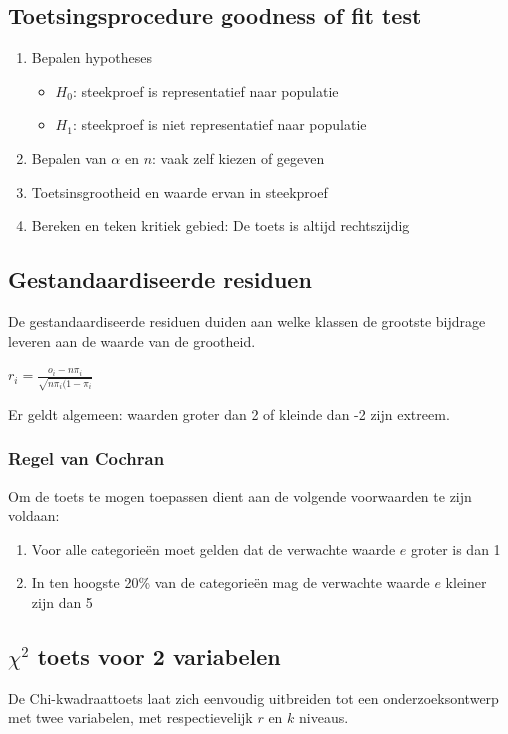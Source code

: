 \documentclass[a4paper,12pt]{article}
\begin{document}
\subsection{Toetsingsprocedure goodness of fit test}
\begin{enumerate}
\item Bepalen hypotheses
	\begin{itemize}
	\item $H_0$: steekproef is representatief naar populatie
	\item $H_1$: steekproef is niet representatief naar populatie
	\end{itemize}
\item Bepalen van $\alpha$ en $n$: vaak zelf kiezen of gegeven
\item Toetsinsgrootheid en waarde ervan in steekproef
\item Bereken en teken kritiek gebied: De toets is altijd rechtszijdig
\end{enumerate}

\subsection{Gestandaardiseerde residuen}
De gestandaardiseerde residuen duiden aan welke klassen de grootste bijdrage leveren aan de waarde van de grootheid.

$r_i = \frac{o_i-n\pi_i}{\sqrt{n\pi_i(1-\pi_i}}$

Er geldt algemeen: waarden groter dan 2 of kleinde dan -2 zijn extreem.

\subsubsection{Regel van Cochran}

Om de toets te mogen toepassen dient aan de volgende voorwaarden te zijn voldaan:
\begin{enumerate}
\item Voor alle categorieën moet gelden dat de verwachte waarde $e$ groter is dan 1
\item In ten hoogste 20\% van de categorieën mag de verwachte waarde $e$ kleiner zijn dan 5
\end{enumerate}

\subsection{$\chi^2$ toets voor 2 variabelen}
De Chi-kwadraattoets laat zich eenvoudig uitbreiden tot een onderzoeksontwerp met twee variabelen, met respectievelijk $r$ en $k$ niveaus.
\end{document}
